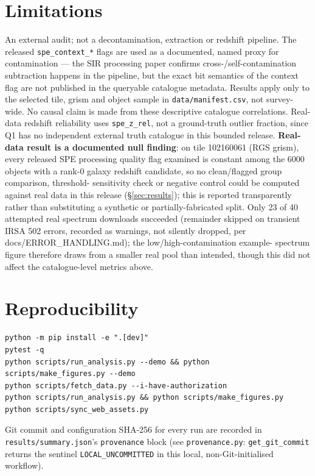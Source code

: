 \documentclass[11pt]{article}
\begin{document}
\section{Limitations}
\label{sec:limitations}
An external audit; not a decontamination, extraction or redshift pipeline. The released
\texttt{spe\_context\_*} flags are used as a documented, named proxy for contamination — the SIR
processing paper confirms cross-/self-contamination subtraction happens in the pipeline, but the exact bit
semantics of the context flag are not published in the queryable catalogue metadata. Results apply only to
the selected tile, grism and object sample in \texttt{data/manifest.csv}, not survey-wide. No causal claim
is made from these descriptive catalogue correlations. Real-data redshift reliability uses
\texttt{spe\_z\_rel}, not a ground-truth outlier fraction, since Q1 has no independent external truth
catalogue in this bounded release. \textbf{Real-data result is a documented null finding}: on tile
102160061 (RGS grism), every released SPE processing quality flag examined is constant among the 6000
objects with a rank-0 galaxy redshift candidate, so no clean/flagged group comparison, threshold-
sensitivity check or negative control could be computed against real data in this release (\S\ref{sec:results}); this
is reported transparently rather than substituting a synthetic or partially-fabricated split. Only 23 of
40 attempted real spectrum downloads succeeded (remainder skipped on transient IRSA 502 errors, recorded
as warnings, not silently dropped, per docs/ERROR\_HANDLING.md); the low/high-contamination example-
spectrum figure therefore draws from a smaller real pool than intended, though this did not affect the
catalogue-level metrics above.

\section{Reproducibility}
\begin{verbatim}
python -m pip install -e ".[dev]"
pytest -q
python scripts/run_analysis.py --demo && python scripts/make_figures.py --demo
python scripts/fetch_data.py --i-have-authorization
python scripts/run_analysis.py && python scripts/make_figures.py
python scripts/sync_web_assets.py
\end{verbatim}
Git commit and configuration SHA-256 for every run are recorded in \texttt{results/summary.json}'s
\texttt{provenance} block (see \texttt{provenance.py}: \texttt{get\_git\_commit} returns the sentinel
\texttt{LOCAL\_UNCOMMITTED} in this local, non-Git-initialised workflow).



\end{document}
